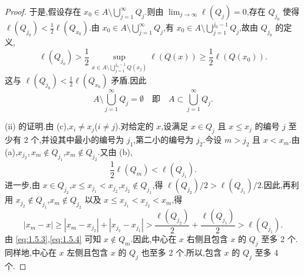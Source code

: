 \begin{proof}
于是,假设存在 $x_{0} \in A \setminus \bigcup_{j=1}^{\infty}Q_{j}$.则由 $\lim_{j \to \infty}\ell(Q_{j}) = 0$,存在 $Q_{j_{0}}$ 使得 $\ell(Q_{j_{0}}) < \frac{1}{2}\ell(Q_{x_{0}})$.由 $x_{0} \in A \setminus \bigcup_{j=1}^{\infty}Q_{j}$,有 $x_{0} \in A \setminus \bigcup_{j=1}^{j_{0}-1}Q_{j}$,故由 $Q_{j_{0}}$ 的定义,
\begin{equation*}
\ell(Q_{j_{0}}) > \frac{1}{2}\sup_{x \in A \setminus \bigcup_{j=1}^{j_{0}-1}Q(x_{j})}\ell(Q(x)) \geq \frac{1}{2}\ell(Q(x_{0})).
\end{equation*}
这与 $\ell(Q_{j_{0}}) < \frac{1}{2}\ell(Q_{x_{0}})$ 矛盾.因此
\begin{equation*}
A \setminus \bigcup_{j=1}^{\infty}Q_{j} = \emptyset \quad \text{即} \quad A \subset \bigcup_{j=1}^{\infty}Q_{j}.
\end{equation*}

(ii) 的证明.由 (c),$x_{i} \neq x_{j}$($i \neq j$).对给定的 $x$,设满足 $x \in Q_{j}$ 且 $x \leq x_{j}$ 的编号 $j$ 至少有 2 个,并设其中最小的编号为 $j_{1}$,第二小的编号为 $j_{2}$.今设 $m > j_{2}$ 且 $x < x_{m}$.由 (a),$x_{j_{2}}, x_{m} \notin Q_{j_{1}}$,$x_{m} \notin Q_{j_{2}}$.又由 (b),
\begin{equation}\tag{1.5.3}
\frac{1}{2}\ell(Q_{m}) < \ell(Q_{j_{1}}).
\label{eq:1.5.3}\end{equation}
进一步,由 $x \in Q_{j_{2}}$,$x \leq x_{j_{1}} < x_{j_{2}}$,$x_{j_{2}} \notin Q_{j_{1}}$,得 $\ell(Q_{j_{2}})/2 > \ell(Q_{j_{1}})/2$.因此,再利用 $x_{j_{2}} \notin Q_{j_{1}}$,$x_{m} \notin Q_{j_{2}}$ 以及 $x \leq x_{j_{1}} < x_{j_{2}} < x_{m}$,得
\begin{equation}\tag{1.5.4}
|x_{m} - x| \geq |x_{m} - x_{j_{2}}| + |x_{j_{2}} - x_{j_{1}}| > \frac{\ell(Q_{j_{2}})}{2} + \frac{\ell(Q_{j_{1}})}{2} > \ell(Q_{j_{1}}).
\label{eq:1.5.4}\end{equation}
由 \eqref{eq:1.5.3},\eqref{eq:1.5.4} 可知 $x \notin Q_{m}$.因此,中心在 $x$ 右侧且包含 $x$ 的 $Q_{j}$ 至多 2 个.同样地,中心在 $x$ 左侧且包含 $x$ 的 $Q_{j}$ 也至多 2 个.所以,包含 $x$ 的 $Q_{j}$ 至多 4 个.


\end{proof}
